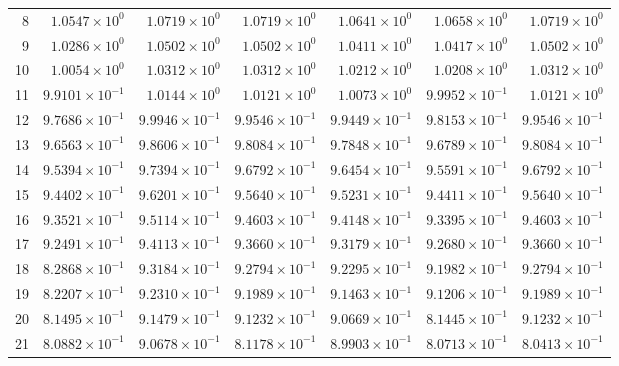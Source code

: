 \begin{table}[H]
\begin{tabular}{@{}rrrrrrr@{}}
8 & $1.0547\times10^{0}$ & $1.0719\times10^{0}$ & $1.0719\times10^{0}$ & $1.0641\times10^{0}$ & $1.0658\times10^{0}$ & $1.0719\times10^{0}$\\
9 & $1.0286\times10^{0}$ & $1.0502\times10^{0}$ & $1.0502\times10^{0}$ & $1.0411\times10^{0}$ & $1.0417\times10^{0}$ & $1.0502\times10^{0}$\\
10 & $1.0054\times10^{0}$ & $1.0312\times10^{0}$ & $1.0312\times10^{0}$ & $1.0212\times10^{0}$ & $1.0208\times10^{0}$ & $1.0312\times10^{0}$\\
11 & $9.9101\times10^{-1}$ & $1.0144\times10^{0}$ & $1.0121\times10^{0}$ & $1.0073\times10^{0}$ & $9.9952\times10^{-1}$ & $1.0121\times10^{0}$\\
12 & $9.7686\times10^{-1}$ & $9.9946\times10^{-1}$ & $9.9546\times10^{-1}$ & $9.9449\times10^{-1}$ & $9.8153\times10^{-1}$ & $9.9546\times10^{-1}$\\
13 & $9.6563\times10^{-1}$ & $9.8606\times10^{-1}$ & $9.8084\times10^{-1}$ & $9.7848\times10^{-1}$ & $9.6789\times10^{-1}$ & $9.8084\times10^{-1}$\\
14 & $9.5394\times10^{-1}$ & $9.7394\times10^{-1}$ & $9.6792\times10^{-1}$ & $9.6454\times10^{-1}$ & $9.5591\times10^{-1}$ & $9.6792\times10^{-1}$\\
15 & $9.4402\times10^{-1}$ & $9.6201\times10^{-1}$ & $9.5640\times10^{-1}$ & $9.5231\times10^{-1}$ & $9.4411\times10^{-1}$ & $9.5640\times10^{-1}$\\
16 & $9.3521\times10^{-1}$ & $9.5114\times10^{-1}$ & $9.4603\times10^{-1}$ & $9.4148\times10^{-1}$ & $9.3395\times10^{-1}$ & $9.4603\times10^{-1}$\\
17 & $9.2491\times10^{-1}$ & $9.4113\times10^{-1}$ & $9.3660\times10^{-1}$ & $9.3179\times10^{-1}$ & $9.2680\times10^{-1}$ & $9.3660\times10^{-1}$\\
18 & $8.2868\times10^{-1}$ & $9.3184\times10^{-1}$ & $9.2794\times10^{-1}$ & $9.2295\times10^{-1}$ & $9.1982\times10^{-1}$ & $9.2794\times10^{-1}$\\
19 & $8.2207\times10^{-1}$ & $9.2310\times10^{-1}$ & $9.1989\times10^{-1}$ & $9.1463\times10^{-1}$ & $9.1206\times10^{-1}$ & $9.1989\times10^{-1}$\\
20 & $8.1495\times10^{-1}$ & $9.1479\times10^{-1}$ & $9.1232\times10^{-1}$ & $9.0669\times10^{-1}$ & $8.1445\times10^{-1}$ & $9.1232\times10^{-1}$\\
21 & $8.0882\times10^{-1}$ & $9.0678\times10^{-1}$ & $8.1178\times10^{-1}$ & $8.9903\times10^{-1}$ & $8.0713\times10^{-1}$ & $8.0413\times10^{-1}$\\

\end{tabular}
\end{table}

